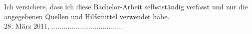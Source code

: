





%
\noindent
Ich versichere, dass ich diese Bachelor-Arbeit selbstständig verfasst und nur die angegebenen Quellen und Hilfsmittel verwendet habe.\\[2em]
%
28. März 2011, .....................................
\newpage

%
%



\tableofcontents


\thispagestyle{empty}

\lstset{language=Plain}








\appendix

\clearscrheadfoot 
\cfoot{\pagemark}


\listoffigures
\listoftables
\lstlistoflistings
%
%
%




